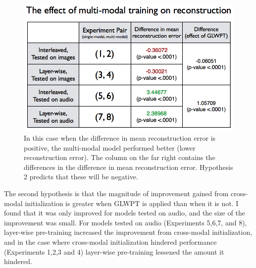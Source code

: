 \documentclass[12pt]{article}
\begin{document}
\begin{doublespacing}
\begin{figure}[p]
\centering
\includegraphics[width=6in]{hypo1table}
\caption{In this case when the difference in mean reconstruction error is positive, the multi-modal model performed better (lower reconstruction error). The column on the far right contains the differences in the difference in mean reconstruction error. Hypothesis 2 predicts that these will be negative. }
\label{fig:hypo1table}
\end{figure}

The second hypothesis is that the magnitude of improvement gained from cross-modal initialization is greater when GLWPT is applied than when it is not. I found that it was only improved for models tested on audio, and the size of the improvement was small. For models tested on audio (Experiments 5,6,7, and 8), layer-wise pre-training increased the improvement from cross-modal initialization, and in the case where cross-modal initialization hindered performance (Experiments 1,2,3 and 4) layer-wise pre-training lessened the amount it hindered.
	

\end{doublespacing}
\end{document}
